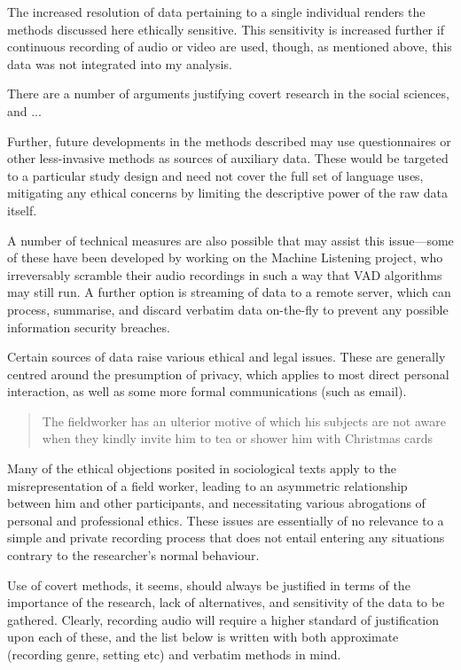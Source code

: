 The increased resolution of data pertaining to a single individual renders the methods discussed here ethically sensitive.  This sensitivity is increased further if continuous recording of audio or video are used, though, as mentioned above, this data was not integrated into my analysis.

There are a number of arguments justifying covert research in the social sciences, and ...


Further, future developments in the methods described may use questionnaires or other less-invasive methods as sources of auxiliary data.  These would be targeted to a particular study design and need not cover the full set of language uses, mitigating any ethical concerns by limiting the descriptive power of the raw data itself.

A number of technical measures are also possible that may assist this issue---some of these have been developed by  working on the Machine Listening project, who irreversably scramble their audio recordings in such a way that VAD algorithms may still run.  A further option is streaming of data to a remote server, which can process, summarise, and discard verbatim data on-the-fly to prevent any possible information security breaches.



Certain sources of data raise various ethical and legal issues. These are generally centred around the presumption of privacy, which applies to most direct personal interaction, as well as some more formal communications (such as email).

\begin{quote}
The fieldworker has an ulterior motive of which his subjects are not aware when they kindly invite him to tea or shower him with Christmas cards
\end{quote}

Many of the ethical objections posited in sociological texts apply to the misrepresentation of a field worker, leading to an asymmetric relationship between him and other participants, and necessitating various abrogations of personal and professional ethics. These issues are essentially of no relevance to a simple and private recording process that does not entail entering any situations contrary to the researcher’s normal behaviour.

Use of covert methods, it seems, should always be justified in terms of the importance of the research, lack of alternatives, and sensitivity of the data to be gathered. Clearly, recording audio will require a higher standard of justification upon each of these, and the list below is written with both approximate (recording genre, setting etc) and verbatim methods in mind.

